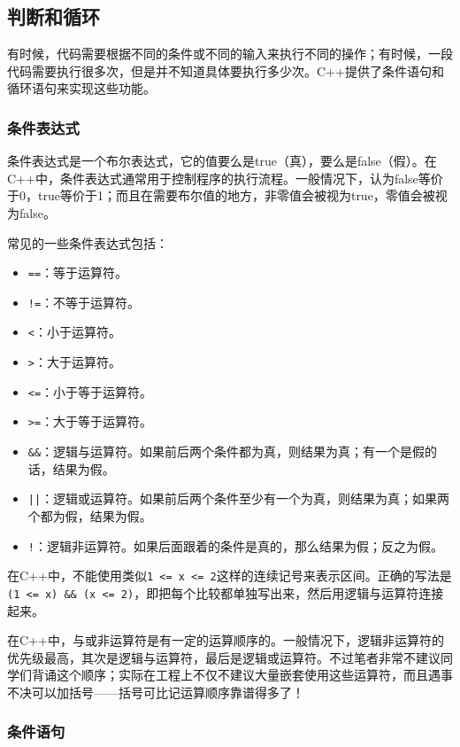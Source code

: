 \documentclass[../main.tex]{subfiles}
\begin{document}
\subsection{判断和循环}
有时候，代码需要根据不同的条件或不同的输入来执行不同的操作；有时候，一段代码需要执行很多次，但是并不知道具体要执行多少次。C++提供了条件语句和循环语句来实现这些功能。

\subsubsection{条件表达式}
条件表达式是一个布尔表达式，它的值要么是true（真），要么是false（假）。在C++中，条件表达式通常用于控制程序的执行流程。一般情况下，认为false等价于0，true等价于1；而且在需要布尔值的地方，非零值会被视为true，零值会被视为false。

常见的一些条件表达式包括：
\begin{itemize}
  \item \texttt{==}：等于运算符。
  \item \texttt{!=}：不等于运算符。
  \item \texttt{<}：小于运算符。
  \item \texttt{>}：大于运算符。
  \item \texttt{<=}：小于等于运算符。
  \item \texttt{>=}：大于等于运算符。
  \item \texttt{\&\&}：逻辑与运算符。如果前后两个条件都为真，则结果为真；有一个是假的话，结果为假。
  \item \texttt{||}：逻辑或运算符。如果前后两个条件至少有一个为真，则结果为真；如果两个都为假，结果为假。
  \item \texttt{!}：逻辑非运算符。如果后面跟着的条件是真的，那么结果为假；反之为假。
\end{itemize}

\begin{tip}
    在C++中，不能使用类似\texttt{1 <= x <= 2}这样的连续记号来表示区间。正确的写法是\texttt{(1 <= x) \&\& (x <= 2)}，即把每个比较都单独写出来，然后用逻辑与运算符连接起来。
\end{tip}

在C++中，与或非运算符是有一定的运算顺序的。一般情况下，逻辑非运算符的优先级最高，其次是逻辑与运算符，最后是逻辑或运算符。不过笔者非常不建议同学们背诵这个顺序；实际在工程上不仅不建议大量嵌套使用这些运算符，而且遇事不决可以加括号——括号可比记运算顺序靠谱得多了！

\subsubsection{条件语句}
\end{document}
